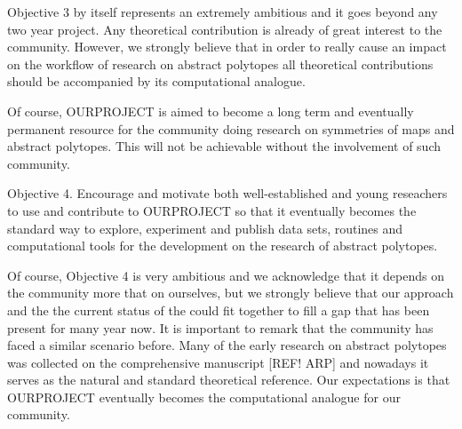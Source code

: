 Objective 3 by itself represents an extremely ambitious and it goes beyond any two year project. Any theoretical contribution is already of great interest to the community. However, we strongly believe that in order to really cause an impact on the workflow of research on abstract polytopes all theoretical contributions should be accompanied by its computational analogue.

Of course, OURPROJECT is aimed to become a long term and eventually permanent resource for the community doing research on symmetries of maps and abstract polytopes. This will not be achievable without the involvement of such community.

Objective 4. Encourage and motivate both well-established and young reseachers to use and contribute to OURPROJECT so that it eventually becomes the standard way to explore, experiment and publish data sets, routines and computational tools for the development on the research of abstract polytopes.

Of course, Objective 4 is very ambitious and we acknowledge that it depends on the community more that on ourselves, but we strongly believe that our approach and the the current status of the could fit together to fill a gap that has been present for many year now. It is important to remark that the community has faced a similar scenario before. Many of the early research on abstract polytopes was collected on the comprehensive manuscript [REF! ARP] and nowadays it serves as the natural and standard theoretical reference. Our expectations is that OURPROJECT eventually becomes the computational analogue for our community.


%
%
%
%
